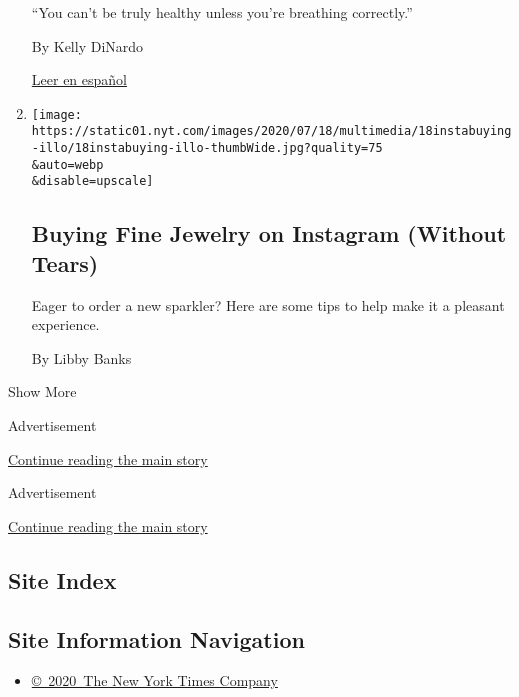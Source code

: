 \begin{enumerate}
  ``You can't be truly healthy unless you're breathing correctly.''

  By Kelly DiNardo

  \href{https://www.nytimes.com/es/2020/07/27/espanol/respira-mejor-con-estos-nueve-ejercicios.html}{Leer
  en español}
\item
  \href{/2020/07/17/fashion/jewelry-instagram-buying-online.html}{}

  \texttt{[image: https://static01.nyt.com/images/2020/07/18/multimedia/18instabuying-illo/18instabuying-illo-thumbWide.jpg?quality=75\\\&auto=webp\\\&disable=upscale]}

  \hypertarget{buying-fine-jewelry-on-instagram-without-tears}{%
  \subsection{Buying Fine Jewelry on Instagram (Without
  Tears)}\label{buying-fine-jewelry-on-instagram-without-tears}}

  Eager to order a new sparkler? Here are some tips to help make it a
  pleasant experience.

  By Libby Banks
\end{enumerate}

Show More

Advertisement

\protect\hyperlink{after-mid2}{Continue reading the main story}

Advertisement

\protect\hyperlink{after-mktg}{Continue reading the main story}

\hypertarget{site-index}{%
\subsection{Site Index}\label{site-index}}

\hypertarget{site-information-navigation}{%
\subsection{Site Information
Navigation}\label{site-information-navigation}}

\begin{itemize}
\tightlist
\item
  \href{https://help.nytimes.com/hc/en-us/articles/115014792127-Copyright-notice}{©~2020~The
  New York Times Company}
\end{itemize}

